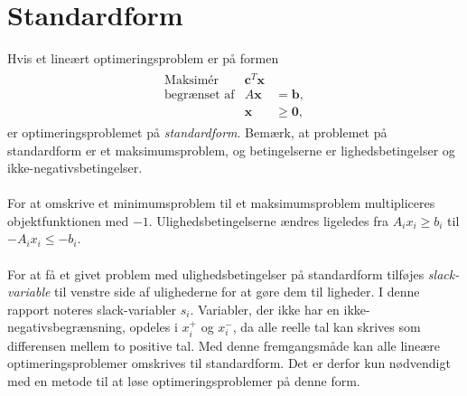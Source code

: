 \section{Standardform}
\label{sec:standard}
% 
Hvis et lineært optimeringsproblem er på formen
%
\begin{align*}
\begin{array}{lrl}
\text{Maksimér}		&\textbf{c}^T\textbf{x}	&				\\
\text{begrænset af}	&A\textbf{x}	&=\mathbf{b},	\\
					&\mathbf{x}				&\geq \mathbf{0},
\end{array}
\end{align*}
%
er optimeringsproblemet på \textit{standardform}.
Bemærk, at problemet på standardform er et maksimumsproblem, og betingelserne er lighedsbetingelser og ikke-negativsbetingelser.
\\\\
%
For at omskrive et minimumsproblem til et maksimumsproblem multipliceres objektfunktionen med $-1$.
Ulighedsbetingelserne ændres ligeledes fra $A_ix_i \geq b_i$ til $-A_ix_i \leq -b_i$.
\\\\
For at få et givet problem med ulighedsbetingelser på standardform tilføjes \textit{slack-variable} til venstre side af ulighederne for at gøre dem til ligheder.
I denne rapport noteres slack-variabler $s_i$.
Variabler, der ikke har en ikke-negativsbegrænsning, opdeles i $x_i^+$ og $x_i^-$, da alle reelle tal kan skrives som differensen mellem to positive tal.
Med denne fremgangsmåde kan alle lineære optimeringsproblemer omskrives til standardform.
Det er derfor kun nødvendigt med en metode til at løse optimeringsproblemer på denne form.
%

